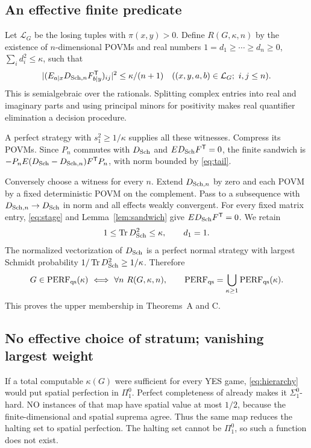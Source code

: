 \subsection{An effective finite predicate}
Let $\mathcal L_G$ be the losing tuples with $\pi(x,y)>0$. Define $R(G,\kappa,n)$ by the existence of $n$-dimensional POVMs and real numbers $1=d_1\geq\cdots\geq d_n\geq0$, $\sum_i d_i^2\leq \kappa$, such that
\begin{equation}\label{eq:stage}
 |(E_{a|x}D_{{\rm Sch},n}F_{b|y}^{\mathsf T})_{ij}|^2\leq \kappa/(n+1)
 \quad((x,y,a,b)\in\mathcal L_G;\ i,j\leq n).
\end{equation}
This is semialgebraic over the rationals. Splitting complex entries into real and imaginary parts and using principal minors for positivity makes real quantifier elimination a decision procedure.

A perfect strategy with $s_1^2\geq1/\kappa$ supplies all these witnesses. Compress its POVMs. Since $P_n$ commutes with $D_{\rm Sch}$ and $ED_{\rm Sch}F^{\mathsf T}=0$, the finite sandwich is $-P_nE(D_{\rm Sch}-D_{{\rm Sch},n})F^{\mathsf T}P_n$, with norm bounded by \eqref{eq:tail}.

Conversely choose a witness for every $n$. Extend $D_{{\rm Sch},n}$ by zero and each POVM by a fixed deterministic POVM on the complement. Pass to a subsequence with $D_{{\rm Sch},n}\to D_{\rm Sch}$ in norm and all effects weakly convergent. For every fixed matrix entry, \eqref{eq:stage} and Lemma~\ref{lem:sandwich} give $ED_{\rm Sch}F^{\mathsf T}=0$. We retain
\[
 1\leq\operatorname{Tr} D_{\rm Sch}^2\leq \kappa,\qquad d_1=1.
\]
The normalized vectorization of $D_{\rm Sch}$ is a perfect normal strategy with largest Schmidt probability $1/\operatorname{Tr} D_{\rm Sch}^2\geq1/\kappa$. Therefore
\begin{equation}\label{eq:hierarchy}
 G\in\mathrm{PERF}_{\mathrm{qs}}(\kappa)\ \Longleftrightarrow\ \forall n\ R(G,\kappa,n),
 \qquad \mathrm{PERF}_{\mathrm{qs}}=\bigcup_{\kappa\geq1}\mathrm{PERF}_{\mathrm{qs}}(\kappa).
\end{equation}
This proves the upper membership in Theorems~A and C.

\subsection{No effective choice of stratum; vanishing largest weight}
If a total computable $\kappa(G)$ were sufficient for every YES game, \eqref{eq:hierarchy} would put spatial perfection in $\Pi^0_1$. Perfect completeness of \cite[Theorem 12.6]{MIPRE} already makes it $\Sigma^0_1$-hard. NO instances of that map have spatial value at most $1/2$, because the finite-dimensional and spatial suprema agree. Thus the same map reduces the halting set to spatial perfection. The halting set cannot be $\Pi^0_1$, so such a function does not exist.

